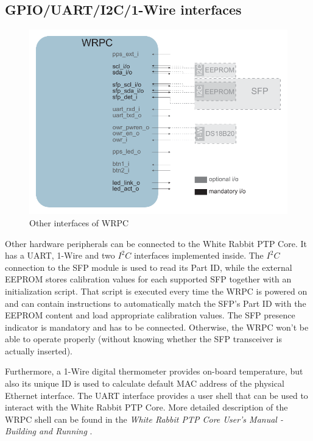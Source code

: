 \newpage
\subsection{GPIO/UART/I2C/1-Wire interfaces}

\begin{figure}[ht]
  \begin{center}
    \includegraphics[width=.9\textwidth]{fig/basic_wrpc_gpio.pdf}
    \caption{Other interfaces of WRPC}
  \end{center}
\end{figure}

Other hardware peripherals can be connected to the White Rabbit PTP
Core. It has a UART, 1-Wire and two $I^2C$ interfaces implemented
inside. The $I^2C$ connection to the SFP module
is used to read its Part ID, while the external EEPROM stores calibration
values for each supported SFP together with an initialization script. That script
is executed every time the WRPC is powered on and can contain instructions to
automatically match the SFP's Part ID with the EEPROM content and load appropriate
calibration values. The SFP presence indicator is mandatory and has to be connected.
Otherwise, the WRPC won't be able to operate properly (without knowing whether
the SFP transceiver is actually inserted).

Furthermore, a 1-Wire digital thermometer provides
on-board temperature, but also its unique ID is used to calculate default MAC
address of the physical Ethernet interface. The UART interface provides a user shell
that can be used to interact with the White Rabbit PTP Core. More detailed
description of the WRPC shell can be found in the \emph{White Rabbit PTP Core User's
Manual - Building and Running} \cite{wrpc_man}.

